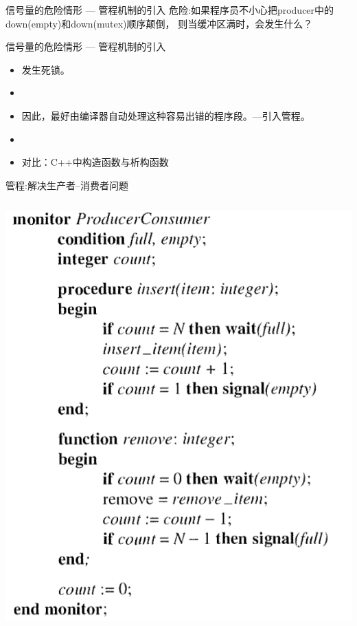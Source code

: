 \documentclass[xcolor=svgnames]{beamer}
\begin{document}
\begin{CJK*}{UTF8}{gbsn}
\begin{frame}{信号量的危险情形 --- 管程机制的引入}
\alert{危险:}如果程序员不小心把producer中的down(empty)和down(mutex)顺序颠倒，
则当缓冲区满时，会发生什么？
\end{frame}

\begin{frame}{信号量的危险情形 --- 管程机制的引入}
\begin{itemize}
\item 发生死锁。
\item[]
\item 因此，最好由编译器自动处理这种容易出错的程序段。---引入管程。
\item[]
\item 对比：C++中构造函数与析构函数
\end{itemize}
\end{frame}

\begin{frame}{管程:解决生产者--消费者问题}
\begin{columns}[b]
\includegraphics[width=1.0\textwidth]{mon1.png}

\end{columns}
\end{frame}
\end{CJK*}
\end{document}
